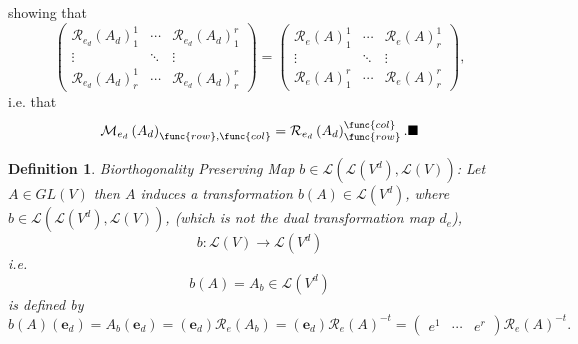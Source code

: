 \documentclass[aps,preprint]{revtex4}
\newtheorem{definition}[theorem]{Definition}
\begin{document}
showing that 
\begin{equation}
\left( 
\begin{array}{ccc}
\mathcal{R}_{e_{d}}\left( A_{d}\right) _{1}^{1} & \cdots & \mathcal{R}%
_{e_{d}}\left( A_{d}\right) _{1}^{r} \\ 
\vdots & \ddots & \vdots \\ 
\mathcal{R}_{e_{d}}\left( A_{d}\right) _{r}^{1} & \cdots & \mathcal{R}%
_{e_{d}}\left( A_{d}\right) _{r}^{r}%
\end{array}%
\right) =\left( 
\begin{array}{ccc}
\mathcal{R}_{e}\left( A\right) _{1}^{1} & \cdots & \mathcal{R}_{e}\left(
A\right) _{r}^{1} \\ 
\vdots & \ddots & \vdots \\ 
\mathcal{R}_{e}\left( A\right) _{1}^{r} & \cdots & \mathcal{R}_{e}\left(
A\right) _{r}^{r}%
\end{array}%
\right) ,
\end{equation}%
i.e. that 
\begin{equation}
\mathcal{M}_{e_{d}}\left( A_{d}\right) _{\func{row},\func{col}}=\mathcal{R}%
_{e_{d}}\left( A_{d}\right) _{\func{row}}^{\func{col}}.\blacksquare
\end{equation}

\begin{definition}
\label{biorthogonality preserving map} Biorthogonality Preserving Map $b\in 
\mathcal{L}\left( \overset{}{\mathcal{L}\left( V^{d}\right) ,\mathcal{L}%
\left( V\right) }\right) $: Let $A\in GL\left( V\right) $ then $A$ induces a
transformation $b\left( A\right) \in \mathcal{L}\left( V^{d}\right) $, where 
$b\in \mathcal{L}\left( \overset{}{\mathcal{L}\left( V^{d}\right) ,\mathcal{L%
}\left( V\right) }\right) $, (which is not the dual transformation map $%
d_{e} $),%
\begin{equation}
b:\mathcal{L}\left( V\right) \rightarrow \mathcal{L}\left( V^{d}\right)
\end{equation}%
i.e. 
\begin{equation}
b\left( A\right) =A_{b}\in \mathcal{L}\left( V^{d}\right)
\end{equation}%
is defined by 
\begin{equation}
b\left( A\right) \left( \boldsymbol{e}_{d}\right) =A_{b}\left( \boldsymbol{e}%
_{d}\right) =\left( \boldsymbol{e}_{d}\right) \mathcal{R}_{e}\left(
A_{b}\right) =\left( \boldsymbol{e}_{d}\right) \mathcal{R}_{e}\left(
A\right) ^{-t}=\left( 
\begin{array}{ccc}
e^{1} & \cdots & e^{r}%
\end{array}%
\right) \mathcal{R}_{e}\left( A\right) ^{-t}.
\end{equation}
\end{definition}
\end{document}

